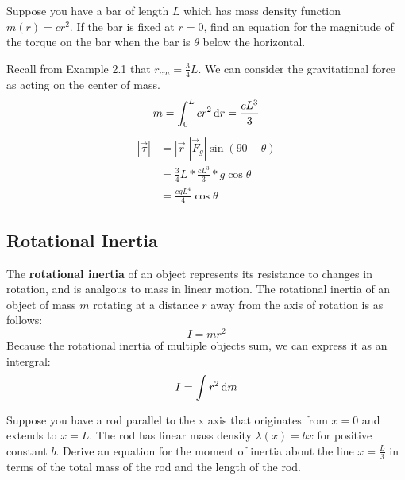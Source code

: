 \documentclass{article}
\begin{document}
\begin{example}
    Suppose you have a bar of length $L$ which has mass density function $m(r) = cr^2$.
    If the bar is fixed at $r = 0$, find an equation for the magnitude of the torque on the bar when the bar is $\theta$ below the horizontal.
\end{example}
\begin{answer}
    Recall from Example 2.1 that $r_{cm} = \frac{3}{4} L$.
    We can consider the gravitational force as acting on the center of mass.
    \[m = \int_{0}^{L} cr^2 \odif{r} = \frac{cL^3}{3}\]
    \begin{align*}
        |\vec{\tau}| &= |\vec{r}||\vec{F}_g|\sin(90 - \theta) \\
        &= \frac{3}{4} L * \frac{cL^3}{3} * g \cos{\theta} \\
        &= \boxed{\frac{cgL^4}{4} \cos{\theta}}
    \end{align*}
\end{answer}

\subsection{Rotational Inertia}
The \textbf{rotational inertia} of an object represents its resistance to changes in rotation, and is analgous to mass in linear motion.
The rotational inertia of an object of mass $m$ rotating at a distance $r$ away from the axis of rotation is as follows:
\[I = mr^2\]
Because the rotational inertia of multiple objects sum, we can express it as an intergral:
\[I = \int r^2 \odif{m}\]

\begin{example}
    Suppose you have a rod parallel to the x axis that originates from $x = 0$ and extends to $x = L$.
    The rod has linear mass density $\lambda (x) = bx$ for positive constant $b$.
    Derive an equation for the moment of inertia about the line $x = \frac{L}{3}$ in terms of the total mass of the rod and the length of the rod. 
\end{example}
\end{document}
